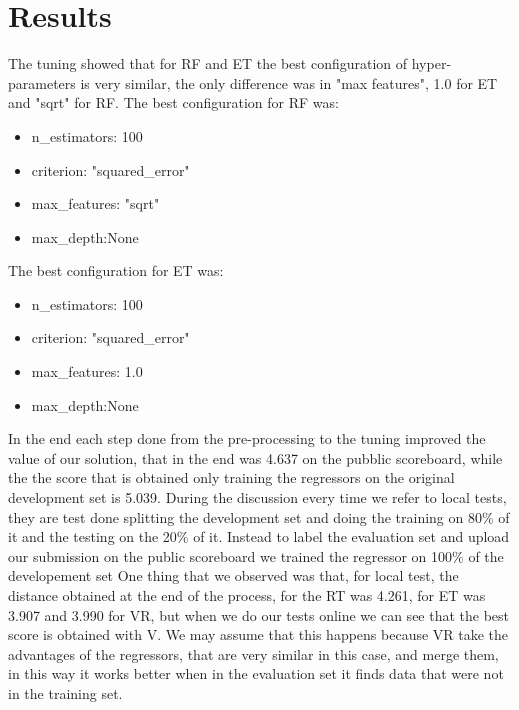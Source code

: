 \documentclass[conference]{IEEEtran}
\begin{document}
\section{Results}


The tuning showed that for RF and ET the best configuration of hyper-parameters is very similar, the only difference was in "max features", 1.0 for ET and "sqrt" for RF.
The best configuration for RF was:

\begin{itemize}
    \item n\_estimators: 100
    \item criterion: "squared\_error"
    \item max\_features: "sqrt"
    \item max\_depth:None
\end{itemize}

The best configuration for ET was:
\begin{itemize}
    \item n\_estimators: 100
    \item criterion: "squared\_error"
    \item max\_features: 1.0
    \item max\_depth:None
\end{itemize}
In the end each step done from the pre-processing to the tuning improved the value of our solution, that in the end was 4.637 on the pubblic scoreboard, while the the score that is obtained only training the regressors on the original development set is 5.039.
During the discussion every time we refer to local tests, they are test done splitting the development set and doing the training on 80\% of it and the testing on the 20\% of it. Instead to label the evaluation set and upload our submission on the public scoreboard we trained the regressor on 100\% of the developement set
One thing that we observed was that, for local test, the distance obtained at the end of the process, for the RT was 4.261, for ET was 3.907 and 3.990 for VR, but when we do our tests online we can see that the best score is obtained with V. We may assume that this happens because VR take the advantages of the regressors, that are very similar in this case, and merge them, in this way it works better when in the evaluation set it finds data that were not in the training set.
\end{document}
